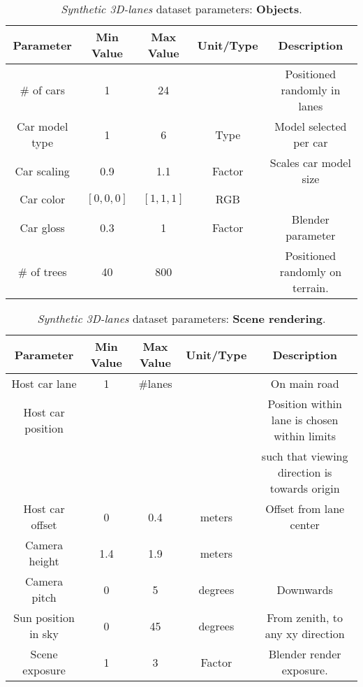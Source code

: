 \documentclass[10pt,twocolumn,letterpaper]{article}
\begin{document}
\begin{table*}[h]
	\centering
	\caption{\emph{Synthetic 3D-lanes} dataset parameters: \textbf{Objects}.}
	\begin{tabular} {*5c}
		\toprule
		\textbf{Parameter} &  \textbf{Min Value} &  \textbf{Max Value} & \textbf{Unit/Type} & \textbf{Description}  \\
		\toprule		
		\# of cars & 1 & 24 & & Positioned randomly in lanes\\
		\midrule
		Car model type & 1 & 6 & Type & Model selected per car\\
		\midrule
		Car scaling & 0.9 & 1.1 & Factor & Scales car model size\\
		\midrule
		Car color & $[0,0,0]$ & $[1,1,1]$ & RGB & \\
		\midrule
		Car gloss & 0.3 & 1 & Factor & Blender parameter\\
		\midrule
		\# of trees & 40 & 800 & & Positioned randomly on terrain.\\
		\bottomrule
		
	\end{tabular} 
	\label{tab:real}
\end{table*}

\begin{table*}[h]
	\centering
	\caption{\emph{Synthetic 3D-lanes} dataset parameters: \textbf{Scene rendering}.}
	\begin{tabular} {*5c}
		\toprule
		\textbf{Parameter} &  \textbf{Min Value} &  \textbf{Max Value} & \textbf{Unit/Type} & \textbf{Description}  \\
		\toprule		
		Host car lane & 1 & \#lanes & & On main road\\
		\midrule
		Host car position &  &  & & Position within lane is chosen within limits\\
		& & & & such that viewing direction is towards origin\\
		\midrule
		Host car offset & 0 & 0.4 & meters & Offset from lane center\\
		\midrule
		Camera height& 1.4 & 1.9 & meters & \\
		\midrule
		Camera pitch& 0 & 5 & degrees & Downwards\\
		\midrule
		Sun position in sky & 0 & 45 &  degrees & From zenith, to any xy direction\\
		\midrule
		Scene exposure & 1  & 3 & Factor  & Blender render exposure.\\
		\bottomrule
	\end{tabular} 
	\label{tab:params_last}
\end{table*}
\end{document}

